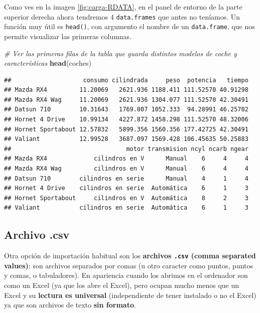 \documentclass[11pt,]{book}
\newenvironment{Shaded}{\begin{snugshade}}{\end{snugshade}}
\newcommand{\CommentTok}[1]{\textcolor[rgb]{0.37,0.37,0.37}{\textit{#1}}}
\newcommand{\KeywordTok}[1]{\textcolor[rgb]{0.27,0.27,0.27}{\textbf{#1}}}
\newcommand{\NormalTok}[1]{#1}
\begin{document}
Como ves en la imagen \ref{fig:carga-RDATA}, en el panel de entorno de la parte superior derecha ahora tendremos 4 \texttt{data.frames} que antes no teníamos. Un función muy útil es \texttt{head()}, con argumento el nombre de un \texttt{data.frame}, que nos permite visualizar las primeras columnas.

\begin{Shaded}
\begin{Highlighting}[]
\CommentTok{# Ver las primeras filas de la tabla que guarda distintos modelos de coche y características}
\KeywordTok{head}\NormalTok{(coches)}
\end{Highlighting}
\end{Shaded}

\begin{verbatim}
##                    consumo cilindrada     peso  potencia   tiempo
## Mazda RX4         11.20069   2621.936 1188.411 111.52570 40.91298
## Mazda RX4 Wag     11.20069   2621.936 1304.077 111.52570 42.30491
## Datsun 710        10.31643   1769.807 1052.333  94.28991 46.25702
## Hornet 4 Drive    10.99134   4227.872 1458.298 111.52570 48.32006
## Hornet Sportabout 12.57832   5899.356 1560.356 177.42725 42.30491
## Valiant           12.99528   3687.097 1569.428 106.45635 50.25883
##                                motor transmision ncyl ncarb ngear
## Mazda RX4             cilindros en V      Manual    6     4     4
## Mazda RX4 Wag         cilindros en V      Manual    6     4     4
## Datsun 710        cilindros en serie      Manual    4     1     4
## Hornet 4 Drive    cilindros en serie  Automática    6     1     3
## Hornet Sportabout     cilindros en V  Automática    8     2     3
## Valiant           cilindros en serie  Automática    6     1     3
\end{verbatim}

\hypertarget{archivo-.csv}{%
\subsection{Archivo .csv}\label{archivo-.csv}}

Otra opción de importación habitual son los \textbf{archivos \texttt{.csv} (comma separated values)}: son archivos separados por comas (u otro caracter como puntos, puntos y comas, o tabuladores). En apariencia cuando los abrimos en el ordenador son como un Excel (ya que los abre el Excel), pero ocupan mucho menos que un Excel y su \textbf{lectura es universal} (independiente de tener instalado o no el Excel) ya que son archivos de texto \textbf{sin formato}.
\end{document}
